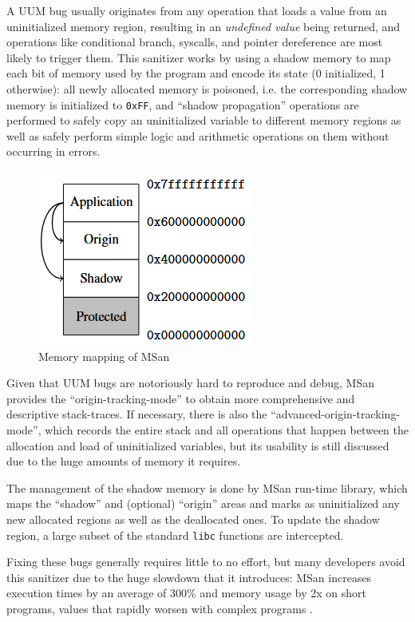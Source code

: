 A UUM bug usually originates from any operation that loads a value from an uninitialized memory region, resulting in an \textit{undefined value} being returned, and operations like conditional branch, syscalls, and pointer dereference are most likely to trigger them. This sanitizer works by using a shadow memory to map each bit of memory used by the program and encode its state (0 initialized, 1 otherwise): all newly allocated memory is poisoned, i.e. the corresponding shadow memory is initialized to \verb|0xFF|, and ``shadow propagation'' operations are performed to safely copy an uninitialized variable to different memory regions as well as safely perform simple logic and arithmetic operations on them without occurring in errors.

\begin{figure}[h]
\centering
\includegraphics[scale=0.8]{foto/shadow_memory_2.png}
\caption{Memory mapping of MSan \cite{stepanov2015memorysanitizer}}
\label{fig:msan_shadow}
\end{figure}

Given that UUM bugs are notoriously hard to reproduce and debug, MSan provides the ``origin-tracking-mode'' to obtain more comprehensive and descriptive stack-traces. If necessary, there is also the ``advanced-origin-tracking-mode'', which records the entire stack and all operations that happen between the allocation and load of uninitialized variables, but its usability is still discussed due to the huge amounts of memory it requires.

The management of the shadow memory is done by MSan run-time library, which maps the ``shadow'' and (optional) ``origin'' areas and marks as uninitialized any new allocated regions as well as the deallocated ones. To update the shadow region, a large subset of the standard \verb|libc| functions are intercepted.

Fixing these bugs generally requires little to no effort, but many developers avoid this sanitizer due to the huge slowdown that it introduces: MSan increases execution times by an average of 300\% and memory usage by 2x on short programs, values that rapidly worsen with complex programs \cite{stepanov2015memorysanitizer}.





